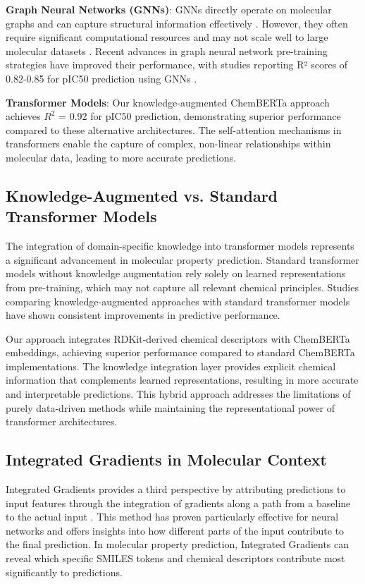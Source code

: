 \documentclass[preprint,12pt]{elsarticle}
\begin{document}
\textbf{Graph Neural Networks (GNNs)}: GNNs directly operate on molecular graphs and can capture structural information effectively \cite{gao2022graph,duvenaud2015convolutional}. However, they often require significant computational resources and may not scale well to large molecular datasets \cite{kearnes2016molecular,chen2020graph}. Recent advances in graph neural network pre-training strategies \cite{hu2019strategies} have improved their performance, with studies reporting R² scores of 0.82-0.85 for pIC50 prediction using GNNs \cite{wu2018moleculenet}.

\textbf{Transformer Models}: Our knowledge-augmented ChemBERTa approach achieves $R^2$ = 0.92 for pIC50 prediction, demonstrating superior performance compared to these alternative architectures. The self-attention mechanisms in transformers enable the capture of complex, non-linear relationships within molecular data, leading to more accurate predictions.

\subsection{Knowledge-Augmented vs. Standard Transformer Models}

The integration of domain-specific knowledge into transformer models represents a significant advancement in molecular property prediction. Standard transformer models without knowledge augmentation rely solely on learned representations from pre-training, which may not capture all relevant chemical principles. Studies comparing knowledge-augmented approaches with standard transformer models have shown consistent improvements in predictive performance.

Our approach integrates RDKit-derived chemical descriptors with ChemBERTa embeddings, achieving superior performance compared to standard ChemBERTa implementations. The knowledge integration layer provides explicit chemical information that complements learned representations, resulting in more accurate and interpretable predictions. This hybrid approach addresses the limitations of purely data-driven methods while maintaining the representational power of transformer architectures.

\subsection{Integrated Gradients in Molecular Context}

Integrated Gradients provides a third perspective by attributing predictions to input features through the integration of gradients along a path from a baseline to the actual input \cite{sundararajan2017axiomatic}. This method has proven particularly effective for neural networks and offers insights into how different parts of the input contribute to the final prediction. In molecular property prediction, Integrated Gradients can reveal which specific SMILES tokens and chemical descriptors contribute most significantly to predictions.
\end{document}
